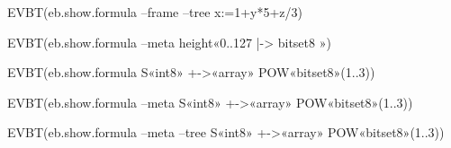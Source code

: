 \documentclass[10pt,a4paper]{article}
\begin{document}
EVBT(eb.show.formula --frame --tree x:=1+y*5+z/3)

EVBT(eb.show.formula --meta height«0..127 |-> bitset8 »)

EVBT(eb.show.formula S«int8» +->«array» POW«bitset8»(1..3))

EVBT(eb.show.formula --meta S«int8» +->«array» POW«bitset8»(1..3))

EVBT(eb.show.formula --meta --tree S«int8» +->«array» POW«bitset8»(1..3))
\end{document}
